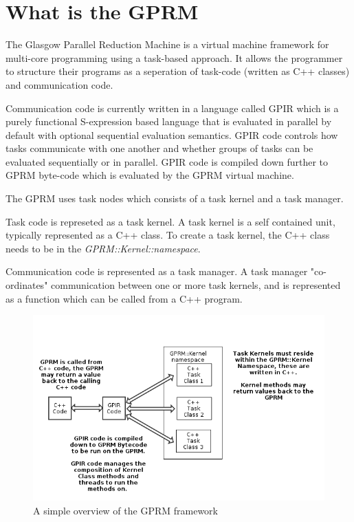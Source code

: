 \section{What is the GPRM}

The Glasgow Parallel Reduction Machine is a virtual machine framework for multi-core programming using a task-based approach. It allows the programmer to structure their programs as a seperation of task-code (written as C++ classes) and communication code. 

Communication code is currently written in a language called GPIR which is a purely functional S-expression based language that is evaluated in parallel by default with optional sequential evaluation semantics. GPIR code controls how tasks communicate with one another and whether groups
of tasks can be evaluated sequentially or in parallel.  GPIR code is compiled down further to GPRM byte-code which is evaluated by the GPRM virtual machine.

The GPRM uses task nodes which consists of a task kernel and a task manager.

Task code is represeted as a task kernel. A task kernel is a self contained unit, typically represented as a C++ class.
To create a task kernel, the C++ class needs to be in the \textit{GPRM::Kernel::namespace}.

Communication code is represented as a task manager. A task manager "co-ordinates" communication between one or more task kernels, and
is represented as a function which can be called from a C++ program.\cite{GPRM}

\newpage

\begin{figure}[ht]
\begin{center}
\includegraphics{graphs/gprm.png}
\caption{A simple overview of the GPRM framework}
\end{center}
\end{figure}

